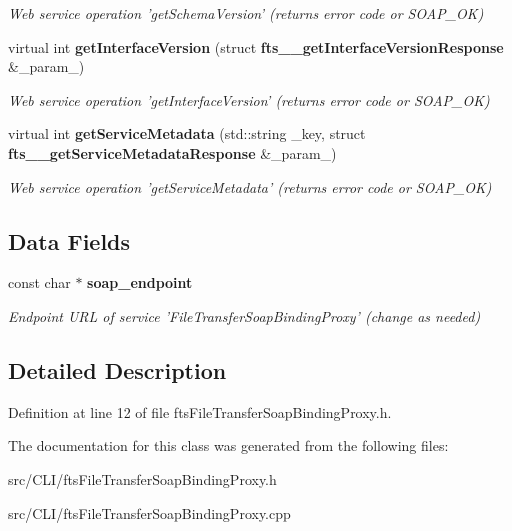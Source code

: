 \begin{DoxyCompactItemize}
\begin{DoxyCompactList}\small\item\em Web service operation 'getSchemaVersion' (returns error code or SOAP\_\-OK) \item\end{DoxyCompactList}\item 
virtual int {\bf getInterfaceVersion} (struct {\bf fts\_\-\_\-getInterfaceVersionResponse} \&\_\-param\_)\label{classFileTransferSoapBindingProxy_ada921f9221acb82c08cd31b980df9479}

\begin{DoxyCompactList}\small\item\em Web service operation 'getInterfaceVersion' (returns error code or SOAP\_\-OK) \item\end{DoxyCompactList}\item 
virtual int {\bf getServiceMetadata} (std::string \_\-key, struct {\bf fts\_\-\_\-getServiceMetadataResponse} \&\_\-param\_)\label{classFileTransferSoapBindingProxy_a26036ac5384b1ea01b60af3b092b8b02}

\begin{DoxyCompactList}\small\item\em Web service operation 'getServiceMetadata' (returns error code or SOAP\_\-OK) \item\end{DoxyCompactList}\end{DoxyCompactItemize}
\subsection*{Data Fields}
\begin{DoxyCompactItemize}
\item 
const char $\ast$ {\bf soap\_\-endpoint}\label{classFileTransferSoapBindingProxy_a62d6402505126d2dabdbba9645c5ec74}

\begin{DoxyCompactList}\small\item\em Endpoint URL of service 'FileTransferSoapBindingProxy' (change as needed) \item\end{DoxyCompactList}\end{DoxyCompactItemize}


\subsection{Detailed Description}


Definition at line 12 of file ftsFileTransferSoapBindingProxy.h.



The documentation for this class was generated from the following files:\begin{DoxyCompactItemize}
\item 
src/CLI/ftsFileTransferSoapBindingProxy.h\item 
src/CLI/ftsFileTransferSoapBindingProxy.cpp\end{DoxyCompactItemize}
